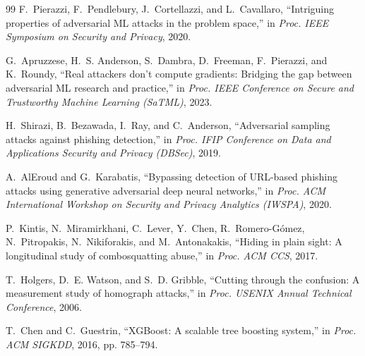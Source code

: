 \documentclass[conference]{IEEEtran}
\begin{document}
\begin{thebibliography}{99}
F.~Pierazzi, F.~Pendlebury, J.~Cortellazzi, and L.~Cavallaro, ``Intriguing properties of adversarial ML attacks in the problem space,'' in \emph{Proc. IEEE Symposium on Security and Privacy}, 2020.

G.~Apruzzese, H.~S. Anderson, S.~Dambra, D.~Freeman, F.~Pierazzi, and K.~Roundy, ``Real attackers don't compute gradients: Bridging the gap between adversarial ML research and practice,'' in \emph{Proc. IEEE Conference on Secure and Trustworthy Machine Learning (SaTML)}, 2023.

H.~Shirazi, B.~Bezawada, I.~Ray, and C.~Anderson, ``Adversarial sampling attacks against phishing detection,'' in \emph{Proc. IFIP Conference on Data and Applications Security and Privacy (DBSec)}, 2019.

A.~AlEroud and G.~Karabatis, ``Bypassing detection of URL-based phishing attacks using generative adversarial deep neural networks,'' in \emph{Proc. ACM International Workshop on Security and Privacy Analytics (IWSPA)}, 2020.

P.~Kintis, N.~Miramirkhani, C.~Lever, Y.~Chen, R.~Romero-G\'omez, N.~Pitropakis, N.~Nikiforakis, and M.~Antonakakis, ``Hiding in plain sight: A longitudinal study of combosquatting abuse,'' in \emph{Proc. ACM CCS}, 2017.

T.~Holgers, D.~E. Watson, and S.~D. Gribble, ``Cutting through the confusion: A measurement study of homograph attacks,'' in \emph{Proc. USENIX Annual Technical Conference}, 2006.

T.~Chen and C.~Guestrin, ``XGBoost: A scalable tree boosting system,'' in \emph{Proc. ACM SIGKDD}, 2016, pp. 785--794.

\end{thebibliography}
\end{document}
